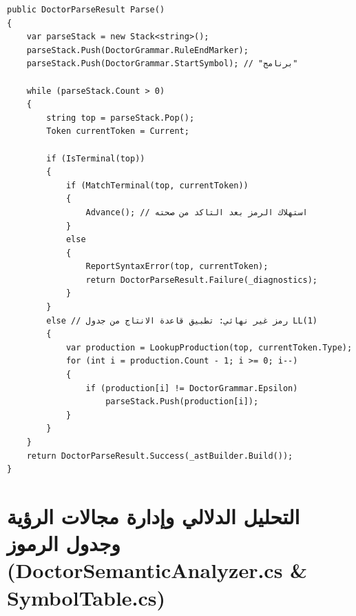 \documentclass[12pt,a4paper]{report}
\begin{document}
\begin{lstlisting}[language={[Sharp]C}, caption={مقتطف حقيقي من التحليل النحوي التنبؤي DoctorLl1Parser.cs}]
public DoctorParseResult Parse()
{
    var parseStack = new Stack<string>();
    parseStack.Push(DoctorGrammar.RuleEndMarker);
    parseStack.Push(DoctorGrammar.StartSymbol); // "برنامج"

    while (parseStack.Count > 0)
    {
        string top = parseStack.Pop();
        Token currentToken = Current;

        if (IsTerminal(top))
        {
            if (MatchTerminal(top, currentToken))
            {
                Advance(); // استهلاك الرمز بعد التاكد من صحته
            }
            else
            {
                ReportSyntaxError(top, currentToken);
                return DoctorParseResult.Failure(_diagnostics);
            }
        }
        else // رمز غير نهائي: تطبيق قاعدة الانتاج من جدول LL(1)
        {
            var production = LookupProduction(top, currentToken.Type);
            for (int i = production.Count - 1; i >= 0; i--)
            {
                if (production[i] != DoctorGrammar.Epsilon)
                    parseStack.Push(production[i]);
            }
        }
    }
    return DoctorParseResult.Success(_astBuilder.Build());
}
\end{lstlisting}

\newpage

\section{التحليل الدلالي وإدارة مجالات الرؤية وجدول الرموز (DoctorSemanticAnalyzer.cs \& SymbolTable.cs)}
\end{document}
